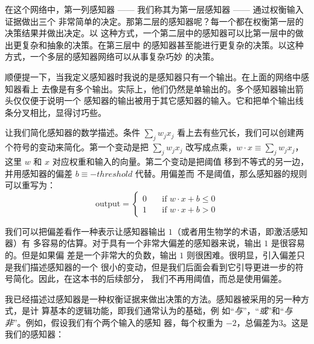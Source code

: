 在这个网络中，第一列感知器 —— 我们称其为第一层感知器 —— 通过权衡输入证据做出三个
非常简单的决定。那第二层的感知器呢？每一个都在权衡第一层的决策结果并做出决定。以
这种方式，一个第二层中的感知器可以比第一层中的做出更复杂和抽象的决策。在第三层中
的感知器甚至能进行更复杂的决策。以这种方式，一个多层的感知器网络可以从事复杂巧妙
的决策。

顺便提一下，当我定义感知器时我说的是感知器只有一个输出。在上面的网络中感知器看上
去像是有多个输出。实际上，他们仍然是单输出的。多个感知器输出箭头仅仅便于说明一个
感知器的输出被用于其它感知器的输入。它和把单个输出线条分叉相比，显得讨巧些。

让我们简化感知器的数学描述。条件 $\sum_j w_j x_j$ 看上去有些冗长，我们可以创建两
个符号的变动来简化。第一个变动是把 $\sum_j w_j x_j$ 改写成点乘，$w \cdot x
\equiv \sum_j w_j x_j$，这里 $w$ 和 $x$ 对应权重和输入的向量。第二个变动是把阈值
移到不等式的另一边，并用感知器的偏差 $b \equiv -threshold$ 代替。用偏差而
不是阈值，那么感知器的规则可以重写为：
\begin{equation}
  \text{output} = \begin{cases}
    0 & \quad \text{if } w\cdot x + b \leq 0 \\
    1 & \quad \text{if } w\cdot x + b > 0
  \end{cases}
  \tag{2}
\end{equation}

我们可以把偏差看作一种表示让感知器输出 $1$（或者用生物学的术语，即激活感知器）有
多容易的估算。对于具有一个非常大偏差的感知器来说，输出 $1$ 是很容易的。但是如果偏
差是一个非常大的负数，输出 $1$ 则很困难。很明显，引入偏差只是我们描述感知器的一个
很小的变动，但是我们后面会看到它引导更进一步的符号简化。因此，在这本书的后续部分，
我们不再用阈值，而总是使用偏差。

我已经描述过感知器是一种权衡证据来做出决策的方法。感知器被采用的另一种方式，是计
算基本的逻辑功能，即我们通常认为的基础，例
如``\emph{与}''，``\emph{或}''和``\emph{与非}''。例如，假设我们有个两个输入的感知
器，每个权重为 $-2$，总偏差为$3$。这是我们的感知器：
\begin{center}
\end{center}


